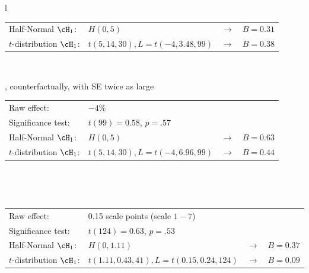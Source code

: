 \begin{table}
\begin{tabular}{l}
\begin{tabular}{p{1.5in}p{2.75in}p{.2in}p{.75in}}
    Half-Normal $\cH_1$:      & $H(0, 5)$                                      & $\rightarrow$ & $B = 0.31$  \\
    $t$-distribution $\cH_1$: & $t(5, 14, 30), L = t(-4, 3.48, 99)$            & $\rightarrow$ & $B = 0.38$
  \end{tabular}                                                                                        \\\hline
  \rule{0pt}{1.5\normalbaselineskip} , counterfactually, with SE twice as large        \\\hline
  \begin{tabular}{p{1.5in}p{2.75in}p{.2in}p{.75in}}
    Raw effect:               & \multicolumn{3}{l}{$-4\%$}                                                   \\ 
    Significance test:        & \multicolumn{3}{l}{$t(99) = 0.58$, $p = .57$}                                \\
    Half-Normal $\cH_1$:      & $H(0, 5)$                                      & $\rightarrow$ & $B = 0.63$  \\
    $t$-distribution $\cH_1$: & $t(5, 14, 30), L = t(-4, 6.96, 99)$            & $\rightarrow$ & $B = 0.44$
  \end{tabular}                                                                                        \\\hline
  \rule{0pt}{1.5\normalbaselineskip}                                                \\\hline
  \begin{tabular}{p{1.5in}p{2.75in}p{.2in}p{.75in}}
    Raw effect:               & \multicolumn{3}{l}{0.15 scale points (scale $1-7$)}                          \\ 
    Significance test:        & \multicolumn{3}{l}{$t(124) = 0.63$, $p = .53$}                               \\
    Half-Normal $\cH_1$:      & $H(0, 1.11)$                                   & $\rightarrow$ & $B = 0.37$  \\
    $t$-distribution $\cH_1$: & $t(1.11, 0.43, 41), L = t(0.15, 0.24, 124)$    & $\rightarrow$ & $B = 0.09$
  \end{tabular}                                                                                        \\\hline
 \end{tabular}
\end{table}


